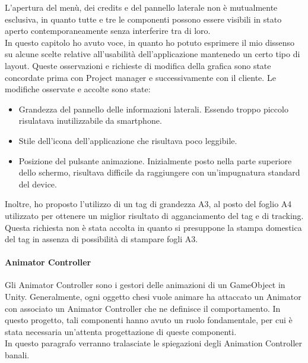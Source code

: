 L'apertura del men\`u, dei credits e del pannello laterale non \`e mutualmente esclusiva, in quanto tutte e tre le componenti possono essere visibili in stato aperto contemporaneamente senza interferire tra di loro.\\


In questo capitolo ho avuto voce, in quanto ho potuto esprimere il mio dissenso su alcune scelte relative all'usabilit\`a dell'applicazione mantenedo un certo tipo di layout. Queste osservazioni e richieste di modifica della grafica sono state concordate prima con Project manager e successivamente con il cliente. Le modifiche osservate e accolte sono state:

\begin{itemize}
	\item Grandezza del pannello delle informazioni laterali. Essendo troppo piccolo risulatava inutilizzabile da smartphone.
	\item Stile dell'icona dell'applicazione che risultava poco leggibile.
	\item Posizione del pulsante animazione. Inizialmente posto nella parte superiore dello schermo, risultava difficile da raggiungere con un'impugnatura standard del device.
\end{itemize}

Inoltre, ho proposto l'utilizzo di un tag di grandezza A3, al posto del foglio A4 utilizzato per ottenere un miglior risultato di agganciamento del tag e di tracking. Questa richiesta non \`e stata accolta in quanto si presuppone la stampa domestica del tag in assenza di possibilit\`a di stampare fogli A3.\\


\paragraph{Animator Controller}
Gli Animator Controller sono i gestori delle animazioni di un GameObject in Unity. Generalmente, ogni oggetto chesi vuole animare ha attaccato un Animator con associato un Animator Controller che ne definisce il comportamento. In questo progetto, tali componenti hanno avuto un ruolo fondamentale, per cui \`e stata necessaria un'attenta progettazione di queste componenti.\\
In questo paragrafo verranno tralasciate le spiegazioni degli Animation Controller banali.\\

